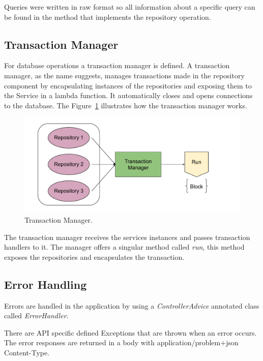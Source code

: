 Queries were written in raw format so all information about a specific query can be found in the method that implements the repository operation.



\subsection{Transaction Manager}
For database operations a transaction manager is defined. A transaction manager, as the name suggests, manages transactions made in the repository component by encapsulating instances of the repositories and exposing them to the Service in a lambda function. It automatically closes and opens connections to the database. The Figure~\ref{fig:TManager} illustrates how the transaction manager works. 

\begin{figure}[!ht]
	\centering
	\includegraphics[width=1\textwidth]{./Chapter4/Figures/TManager}
	\caption{Transaction Manager.}
	\label{fig:TManager}
\end{figure}

The transaction manager receives the services instances and passes transaction handlers to it. The manager offers a singular method called \textit{run}, this method exposes the repositories and encapsulates the transaction.

\newpage

\subsection{Error Handling}
Errors are handled in the application by using a \textit{ControllerAdvice} annotated class called \textit{ErrorHandler}.

There are API specific defined Exceptions that are thrown when an error occurs.
The error responses are returned in a body with application/problem+json Content-Type.

